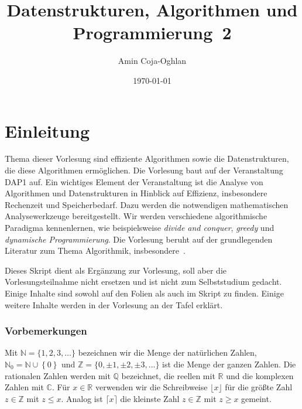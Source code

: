 \documentclass[10pt,reqno]{amsart}
\numberwithin{equation}{section}
\newcommand\NN{\mathbb N}
\newcommand\ZZ{\mathbb Z}
\newcommand\QQ{\mathbb Q}
\newcommand\RR{\mathbb R}
\newcommand\CC{\mathbb C}
\newcommand\cbc[1]{\left\{{#1}\right\}}
\begin{document}
\title{Datenstrukturen, Algorithmen und Programmierung~2}

\author{Amin Coja-Oghlan}
\date{\today} 

\address{Amin Coja-Oghlan, {\tt  dap2.eac.fk04@tu-dortmund.de}, TU Dortmund, Fakult\"at~4, Lehrstuhl Informatik 2, Otto Hahn Str.~12, 44227 Dortmund}

\maketitle



\section{Einleitung}
Thema dieser Vorlesung sind effiziente Algorithmen sowie die Datenstrukturen, die diese Algorithmen erm\"oglichen.
Die Vorlesung baut auf der Veranstaltung DAP1 auf.
Ein wichtiges Element der Veranstaltung ist die Analyse von Algorithmen und Datenstrukturen in Hinblick auf Effizienz, insbesondere Rechenzeit und Speicherbedarf.
Dazu werden die notwendigen mathematischen Analysewerkzeuge bereitgestellt.
Wir werden verschiedene algorithmische Paradigma kennenlernen, wie beispielsweise {\em divide and conquer}, {\em greedy} und {\em dynamische Programmierung}.
Die Vorlesung beruht auf der grundlegenden Literatur zum Thema Algorithmik, insbesondere~\cite{Cormen}.

Dieses Skript dient als Erg\"anzung zur Vorlesung, soll aber die Vorlesungsteilnahme nicht ersetzen und ist nicht zum Selbststudium gedacht.
Einige Inhalte sind sowohl auf den Folien als auch im Skript zu finden.
Einige weitere Inhalte werden in der Vorlesung an der Tafel erkl\"art.

\subsubsection*{Vorbemerkungen}
Mit $\NN=\{1,2,3,\ldots\}$ bezeichnen wir die Menge der nat\"urlichen Zahlen, $\NN_0=\NN\cup\cbc0$ und $\ZZ=\{0,\pm1,\pm2,\pm3,\ldots\}$ ist die Menge der ganzen Zahlen. 
Die rationalen Zahlen werden mit $\QQ$ bezeichnet, die reellen mit $\RR$ und die komplexen Zahlen mit $\CC$.
F\"ur $x\in\RR$ verwenden wir die Schreibweise $\lfloor x\rfloor$ f\"ur die gr\"o\ss te Zahl $z\in\ZZ$ mit $z\leq x$.
Analog ist $\lceil x\rceil$ die kleinste Zahl $z\in\ZZ$ mit $z\geq x$ gemeint.
\end{document}
